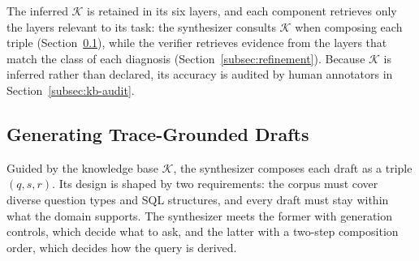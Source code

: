 \documentclass[letterpaper,journal]{IEEEtran}
\begin{document}
The inferred $\mathcal{K}$ is retained in its six layers, and each component retrieves only the layers relevant to its task: the synthesizer consults $\mathcal{K}$ when composing each triple (Section~\ref{subsec:generation}), while the verifier retrieves evidence from the layers that match the class of each diagnosis (Section~\ref{subsec:refinement}). Because $\mathcal{K}$ is inferred rather than declared, its accuracy is audited by human annotators in Section~\ref{subsec:kb-audit}.

\begin{table}[!ht]
\centering
\caption{Overview of the Six-Stage Semantic Extraction Process}
\label{tab:extraction-pipeline}
\end{table}

\subsection{Generating Trace-Grounded Drafts}
\label{subsec:generation}

Guided by the knowledge base $\mathcal{K}$, the synthesizer composes each draft as a triple $(q, s, r)$. Its design is shaped by two requirements: the corpus must cover diverse question types and SQL structures, and every draft must stay within what the domain supports. The synthesizer meets the former with generation controls, which decide what to ask, and the latter with a two-step composition order, which decides how the query is derived.
\end{document}
